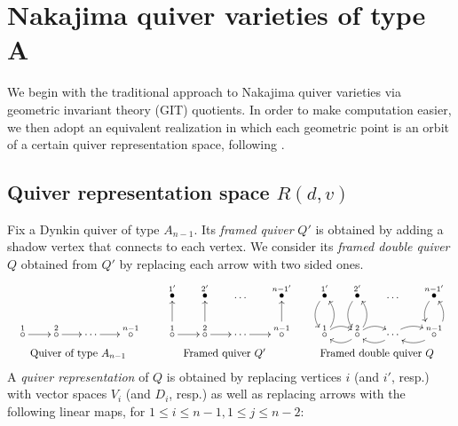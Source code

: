 \documentclass[11pt,reqno]{amsart}
\numberwithin{equation}{section}
\theoremstyle{definition}
\begin{document}
\section{Nakajima quiver varieties of type A}\label{sec:Naka}
We begin with the traditional approach to Nakajima quiver varieties via geometric invariant theory (GIT) quotients. 
In order to make computation easier, we then adopt an equivalent realization in which each geometric point is an orbit of a certain quiver representation space, following \cite{Maf05}. 

\subsection{Quiver representation space $R(d,v)$}
Fix a Dynkin quiver of type $A_{n-1}$. 
Its {\em framed quiver} $Q'$ is obtained by adding a shadow vertex that connects to each vertex.
We consider its {\em framed double quiver} $Q$ obtained from $Q'$ by replacing each arrow with two sided ones.
\[
\begin{tabular}{ccc}
$\xymatrix@-.5pc{
{~}\phantom{\stackrel{1'}{\bullet}}
\\ 
\stackrel{1}{\circ} \ar[r] 
& \stackrel{2}{\circ}\ar[r] 
& \cdots \ar[r] 
& \stackrel{n-1}{\circ}   
\\ 
}
$ 
&
\quad
$\xymatrix@-.5pc{
\stackrel{1'}{\bullet}
& \stackrel{2'}{\bullet}
& \ldots 
&\stackrel{n-1'}{\bullet}
\\ 
\stackrel{1}{\circ} \ar[r] \ar[u] 
& \stackrel{2}{\circ}\ar[r] \ar[u]
& \cdots \ar[r] 
& \stackrel{n-1}{\circ} \ar[u]  \\ 
}
$ 
&
\quad
$\xymatrix@-.5pc{
\stackrel{1'}{\bullet} \ar@/_.75pc/[d]
& \stackrel{2'}{\bullet} \ar@/_.75pc/[d]
& \ldots 
&\stackrel{n-1'}{\bullet} \ar@/_.75pc/[d]
\\ 
\stackrel{1}{\circ}  \ar@/^.65pc/[r]_{} \ar@/_.75pc/[u] 
& \stackrel{2}{\circ}\ar@/^.65pc/[l] \ar@/^.65pc/[r]_{} \ar@/_.75pc/[u]
& \cdots \ar@/^.65pc/[l] \ar@/^.65pc/[r]_{} 
& \stackrel{n-1}{\circ} \ar@/^.65pc/[l] \ar@/_.75pc/[u]  \\ 
}$ 
\\[1.5cm]
Quiver of type $A_{n-1}$
&
Framed quiver $Q'$
&
Framed double quiver $Q$
\end{tabular}
\]
A {\em quiver representation} of $Q$ is obtained by replacing vertices $i$ (and $i'$, resp.) with vector spaces $V_i$ (and $D_i$, resp.) as well as replacing arrows with the following linear maps, for $1\leq i \leq n-1, 1\leq j \leq n-2$:
\end{document}
